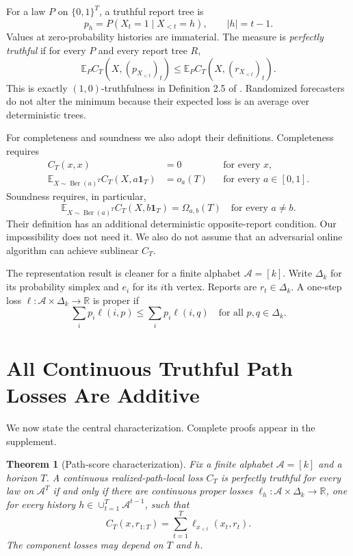 \documentclass[twoside]{article}
\newtheorem{theorem}{Theorem}
\newcommand{\E}{\mathbb E}
\newcommand{\cA}{\mathcal A}
\newcommand{\1}{\mathbf 1}
\begin{document}
For a law $P$ on $\{0,1\}^T$, a truthful report tree is
\begin{equation*}
 p_h=P(X_t=1\mid X_{<t}=h),\qquad |h|=t-1.
\end{equation*}
Values at zero-probability histories are immaterial. The measure is \emph{perfectly truthful} if for every $P$ and every report tree $R$,
\begin{equation}
 \E_P C_T(X,(p_{X_{<t}})_t)
 \leq \E_P C_T(X,(r_{X_{<t}})_t).
 \label{eq:truth}
\end{equation}
This is exactly $(1,0)$-truthfulness in Definition 2.5 of \citet{haghtalab2024truthfulness}. Randomized forecasters do not alter the minimum because their expected loss is an average over deterministic trees.

For completeness and soundness we also adopt their definitions. Completeness requires
\begin{align}
 C_T(x,x)&=0 &&\text{for every }x, \label{eq:endpoint}\\
 \E_{X\sim\operatorname{Ber}(a)^T}C_T(X,a\1_T)&=o_a(T)
 &&\text{for every }a\in[0,1]. \label{eq:complete}
\end{align}
Soundness requires, in particular,
\begin{equation}
 \E_{X\sim\operatorname{Ber}(a)^T}C_T(X,b\1_T)
 =\Omega_{a,b}(T)
 \quad\text{for every }a\ne b.
 \label{eq:sound}
\end{equation}
Their definition has an additional deterministic opposite-report condition. Our impossibility does not need it. We also do not assume that an adversarial online algorithm can achieve sublinear $C_T$.

The representation result is cleaner for a finite alphabet $\cA=[k]$. Write $\Delta_k$ for its probability simplex and $e_i$ for its $i$th vertex. Reports are $r_t\in\Delta_k$. A one-step loss $\ell:\cA\times\Delta_k\to\mathbb R$ is proper if
\begin{equation}
 \sum_i p_i\ell(i,p)\leq\sum_i p_i\ell(i,q)
 \quad\text{for all }p,q\in\Delta_k.
 \label{eq:proper}
\end{equation}

\section{All Continuous Truthful Path Losses Are Additive}
\label{sec:structure}

We now state the central characterization. Complete proofs appear in the supplement.

\begin{theorem}[Path-score characterization]
\label{thm:structure}
Fix a finite alphabet $\cA=[k]$ and a horizon $T$. A continuous realized-path-local loss $C_T$ is perfectly truthful for every law on $\cA^T$ if and only if there are continuous proper losses $\ell_h:\cA\times\Delta_k\to\mathbb R$, one for every history $h\in\cup_{t=1}^T\cA^{t-1}$, such that
\begin{equation}
 C_T(x,r_{1:T})=\sum_{t=1}^T
 \ell_{x_{<t}}(x_t,r_t).
 \label{eq:structure}
\end{equation}
The component losses may depend on $T$ and $h$.
\end{theorem}
\end{document}
